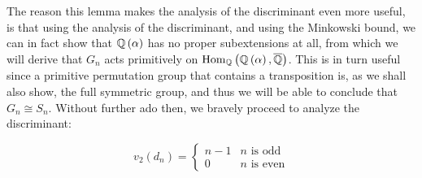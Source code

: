\documentclass[../main.tex]{subfiles}
\begin{document}
The reason this lemma makes the analysis of the discriminant even more useful, is that using the analysis of the discriminant, and using the Minkowski bound, we can in fact show that $\mathbb{Q}\left( \alpha \right)$ has no proper subextensions at all, from which we will derive that $G_n$ acts primitively on $\operatorname{\rm Hom}_{\mathbb{Q}}\left( \mathbb{Q}\left( \alpha \right), \overline{\mathbb{Q}} \right)$.
This is in turn useful since a primitive permutation group that contains a transposition is, as we shall also show, the full symmetric group, and thus we will be able to conclude that $G_n \cong S_n$.
Without further ado then, we bravely proceed to analyze the discriminant:

\begin{lemma}
  \label{lem:2-adic-valuation-of-discriminant}
\[
  v_2\left( d_n \right) = \begin{cases}
    n - 1 & n \text{ is odd} \\
    0 & n \text{ is even}
  \end{cases}
\]
\end{lemma}
\end{document}
